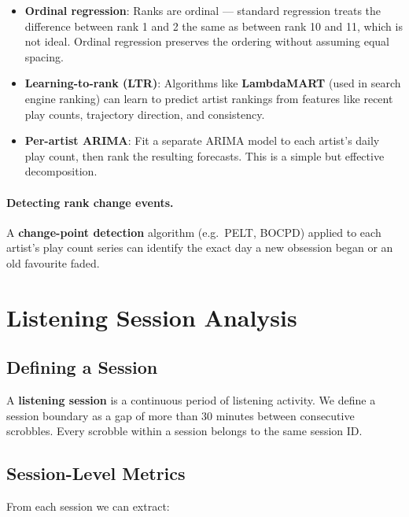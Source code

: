 \documentclass[12pt, a4paper]{article}
\begin{document}
\begin{itemize}
    \item \textbf{Ordinal regression}: Ranks are ordinal --- standard
          regression treats the difference between rank 1 and 2 the same as
          between rank 10 and 11, which is not ideal. Ordinal regression
          preserves the ordering without assuming equal spacing.
    \item \textbf{Learning-to-rank (LTR)}: Algorithms like
          \textbf{LambdaMART} (used in search engine ranking) can learn to
          predict artist rankings from features like recent play counts,
          trajectory direction, and consistency.
    \item \textbf{Per-artist ARIMA}: Fit a separate ARIMA model to each
          artist's daily play count, then rank the resulting forecasts. This
          is a simple but effective decomposition.
\end{itemize}

\paragraph{Detecting rank change events.}
A \textbf{change-point detection} algorithm (e.g.\ PELT, BOCPD) applied to
each artist's play count series can identify the exact day a new obsession
began or an old favourite faded.

\section{Listening Session Analysis}

\subsection{Defining a Session}

A \textbf{listening session} is a continuous period of listening activity.
We define a session boundary as a gap of more than 30 minutes between
consecutive scrobbles. Every scrobble within a session belongs to the same
session ID.

\subsection{Session-Level Metrics}

From each session we can extract:
\end{document}
